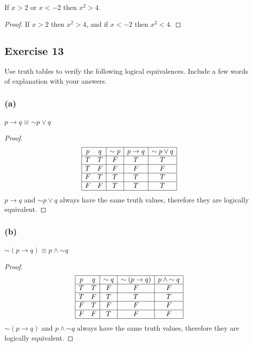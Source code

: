 \documentclass[14pt]{extarticle}
\begin{document}
\begin{center} If $x > 2$ or $x < -2$ then $x^2 > 4$. \end{center}
\begin{proof} If $x > 2$ then $x^2 > 4$, and if $x < -2$ then $x^2 < 4$.
\end{proof}

\subsection{Exercise 13} Use truth tables to verify the following logical
equivalences. Include a few words of explanation with your answers.

\subsubsection{(a)} $p \to q \equiv {\sim p} \vee q$
\begin{proof} $$ \begin{array}{|cc|c|c|c|} \hline p & q & {\sim p} & p \to q &
{\sim p} \vee q \\ \hline T & T & F & T & T \\ \hline T & F & F & F & F \\
\hline F & T & T & T & T \\ \hline F & F & T & T & T \\ \hline \end{array} $$ $p
\to q$ and ${\sim p} \vee q$ always have the same truth values, therefore they
are logically equivalent. \end{proof}

\subsubsection{(b)} ${\sim (p \to q)} \equiv p \wedge {\sim q}$
\begin{proof} $$ \begin{array}{|cc|c|c|c|} \hline p & q & {\sim q} & {\sim (p
\to q)} & p \wedge {\sim q} \\ \hline T & T & F & F & F \\ \hline T & F & T & T
& T \\ \hline F & T & F & F & F \\ \hline F & F & T & F & F \\ \hline
\end{array} $$ ${\sim (p \to q)}$ and $p \wedge {\sim q}$ always have the same
truth values, therefore they are logically equivalent. \end{proof}
\end{document}
